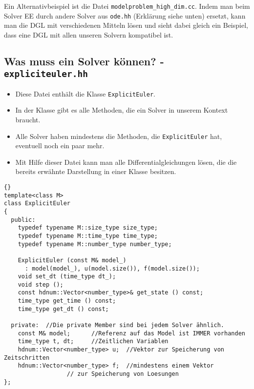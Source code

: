 \documentclass[a4paper,11pt]{article}
\theoremstyle{definition}
\begin{document}
Ein Alternativbeispiel ist die Datei \lstinline{modelproblem_high_dim.cc}. Indem man beim Solver EE durch andere Solver aus \lstinline{ode.hh} (Erklärung siehe unten) ersetzt, kann man die DGL mit verschiedenen Mitteln lösen und sieht dabei gleich ein Beispiel, dass eine DGL mit allen unseren Solvern kompatibel ist.

\subsection{Was muss ein Solver können? - \lstinline{expliciteuler.hh}}
\begin{itemize}
\item Diese Datei enthält die Klasse \lstinline{ExplicitEuler}. 
\item In der Klasse gibt es alle Methoden, die ein Solver in unserem Kontext braucht.
\item Alle Solver haben mindestens die Methoden, die \lstinline{ExplicitEuler} hat, eventuell noch ein paar mehr.
\item Mit Hilfe dieser Datei kann man alle Differentialgleichungen lösen, die die bereits erwähnte Darstellung in einer Klasse besitzen.
\end{itemize}

{\footnotesize{\begin{lstlisting}{}
template<class M>
class ExplicitEuler
{
  public:
    typedef typename M::size_type size_type; 
    typedef typename M::time_type time_type;
    typedef typename M::number_type number_type;

    ExplicitEuler (const M& model_)
      : model(model_), u(model.size()), f(model.size());
    void set_dt (time_type dt_);
    void step ();
    const hdnum::Vector<number_type>& get_state () const;
    time_type get_time () const;
    time_type get_dt () const;

  private:  //Die private Member sind bei jedem Solver ähnlich.
    const M& model;      //Referenz auf das Model ist IMMER vorhanden
    time_type t, dt;     //Zeitlichen Variablen
    hdnum::Vector<number_type> u;  //Vektor zur Speicherung von Zeitschritten
    hdnum::Vector<number_type> f;  //mindestens einem Vektor
                  // zur Speicherung von Loesungen
};
\end{lstlisting}}}
\end{document}
